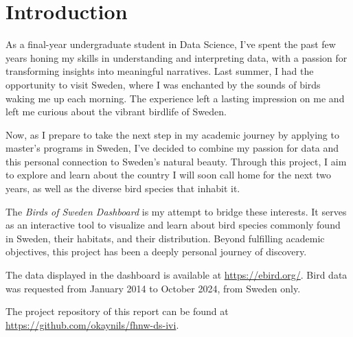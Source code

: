 \chapter{Introduction}

As a final-year undergraduate student in Data Science, I've spent the past few years honing my skills in understanding and interpreting data, with a passion for transforming insights into meaningful narratives. Last summer, I had the opportunity to visit Sweden, where I was enchanted by the sounds of birds waking me up each morning. The experience left a lasting impression on me and left me curious about the vibrant birdlife of Sweden.

Now, as I prepare to take the next step in my academic journey by applying to master's programs in Sweden, I've decided to combine my passion for data and this personal connection to Sweden's natural beauty. Through this project, I aim to explore and learn about the country I will soon call home for the next two years, as well as the diverse bird species that inhabit it.

The \textit{Birds of Sweden Dashboard} is my attempt to bridge these interests. It serves as an interactive tool to visualize and learn about bird species commonly found in Sweden, their habitats, and their distribution. Beyond fulfilling academic objectives, this project has been a deeply personal journey of discovery.

The data displayed in the dashboard is available at \url{https://ebird.org/}. Bird data was requested from January 2014 to October 2024, from Sweden only.

The project repository of this report can be found at \url{https://github.com/okaynils/fhnw-ds-ivi}.